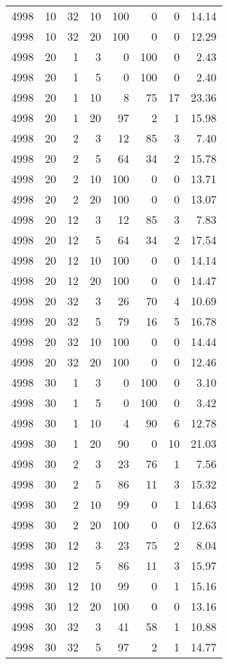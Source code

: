 \begin{tabular}{rrrrrrrr}
4998 & 10 & 32 & 10 & 100 & 0 & 0 & 14.14 \\
4998 & 10 & 32 & 20 & 100 & 0 & 0 & 12.29 \\
4998 & 20 & 1 & 3 & 0 & 100 & 0 & 2.43 \\
4998 & 20 & 1 & 5 & 0 & 100 & 0 & 2.40 \\
4998 & 20 & 1 & 10 & 8 & 75 & 17 & 23.36 \\
4998 & 20 & 1 & 20 & 97 & 2 & 1 & 15.98 \\
4998 & 20 & 2 & 3 & 12 & 85 & 3 & 7.40 \\
4998 & 20 & 2 & 5 & 64 & 34 & 2 & 15.78 \\
4998 & 20 & 2 & 10 & 100 & 0 & 0 & 13.71 \\
4998 & 20 & 2 & 20 & 100 & 0 & 0 & 13.07 \\
4998 & 20 & 12 & 3 & 12 & 85 & 3 & 7.83 \\
4998 & 20 & 12 & 5 & 64 & 34 & 2 & 17.54 \\
4998 & 20 & 12 & 10 & 100 & 0 & 0 & 14.14 \\
4998 & 20 & 12 & 20 & 100 & 0 & 0 & 14.47 \\
4998 & 20 & 32 & 3 & 26 & 70 & 4 & 10.69 \\
4998 & 20 & 32 & 5 & 79 & 16 & 5 & 16.78 \\
4998 & 20 & 32 & 10 & 100 & 0 & 0 & 14.44 \\
4998 & 20 & 32 & 20 & 100 & 0 & 0 & 12.46 \\
4998 & 30 & 1 & 3 & 0 & 100 & 0 & 3.10 \\
4998 & 30 & 1 & 5 & 0 & 100 & 0 & 3.42 \\
4998 & 30 & 1 & 10 & 4 & 90 & 6 & 12.78 \\
4998 & 30 & 1 & 20 & 90 & 0 & 10 & 21.03 \\
4998 & 30 & 2 & 3 & 23 & 76 & 1 & 7.56 \\
4998 & 30 & 2 & 5 & 86 & 11 & 3 & 15.32 \\
4998 & 30 & 2 & 10 & 99 & 0 & 1 & 14.63 \\
4998 & 30 & 2 & 20 & 100 & 0 & 0 & 12.63 \\
4998 & 30 & 12 & 3 & 23 & 75 & 2 & 8.04 \\
4998 & 30 & 12 & 5 & 86 & 11 & 3 & 15.97 \\
4998 & 30 & 12 & 10 & 99 & 0 & 1 & 15.16 \\
4998 & 30 & 12 & 20 & 100 & 0 & 0 & 13.16 \\
4998 & 30 & 32 & 3 & 41 & 58 & 1 & 10.88 \\
4998 & 30 & 32 & 5 & 97 & 2 & 1 & 14.77 \\

\end{tabular}
